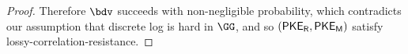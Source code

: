 \begin{proof}
	Therefore $\bdv$ succeeds with non-negligible probability, which contradicts our assumption that discrete log is hard in $\group$, and so $({{\mathsf{PKE}_{{\mathsf{R}}}}}, {{\mathsf{PKE}_{{\mathsf{M}}}}})$ satisfy lossy-correlation-resistance.
\end{proof}

